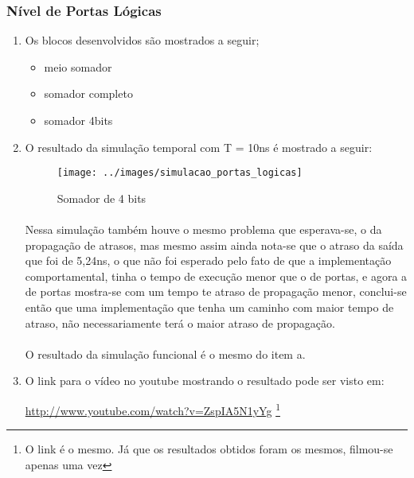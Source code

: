 \subsubsection{Nível de Portas Lógicas}
\begin{enumerate}[label=(\alph*)]
\item Os blocos desenvolvidos são mostrados a seguir;
\begin{itemize}

    \item meio somador
\begin{tiny}
    
\end{tiny}   

    \item somador completo
\begin{tiny}
    
\end{tiny}   
    \item somador 4bits
\begin{tiny}
    
\end{tiny}  
\end{itemize}

\item  O resultado da simulação temporal com T = 10ns é mostrado a seguir:

\begin{figure}[H]
    \centering
    \texttt{[image: ../images/simulacao\_portas\_logicas]}
    \caption{Somador de 4 bits}
\end{figure}

\paragraph{}Nessa simulação também houve o mesmo problema que esperava-se, o da propagação de atrasos, mas mesmo assim ainda nota-se que o atraso da saída que foi de 5,24ns, o que não foi esperado pelo fato de que a implementação comportamental, tinha o tempo de execução menor que o de portas, e agora a de portas mostra-se com um tempo te atraso de propagação menor, conclui-se então que uma implementação que tenha um caminho com maior tempo de atraso, não necessariamente terá o maior atraso de propagação.

\paragraph{}O resultado da simulação funcional é o mesmo do item a.
\item
O link para o vídeo no youtube mostrando o resultado pode ser visto em:

\url{http://www.youtube.com/watch?v=ZspIA5N1yYg}
\footnote{O link é o mesmo. Já que os resultados obtidos foram os mesmos, filmou-se apenas uma vez}
\end{enumerate}
